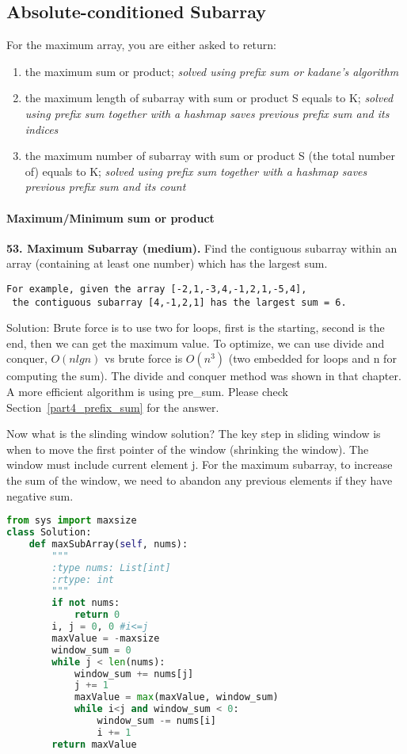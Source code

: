\documentclass[../main.tex]{subfiles}
\begin{document}
\subsection{Absolute-conditioned Subarray}
For the maximum array, you are either asked to return: 
\begin{enumerate}
\item the maximum sum or product; \textit{solved using prefix sum or kadane's algorithm}
\item the maximum length of subarray with sum or product S equals to K; \textit{solved using prefix sum together with a hashmap saves previous prefix sum and its indices}
\item the maximum number of subarray with sum or product S (the total number of) equals to K; \textit{solved using prefix sum together with a hashmap saves previous prefix sum and its count}
\end{enumerate}

\paragraph{Maximum/Minimum sum or product}
\begin{examples}[resume]
\item \textbf{53. Maximum Subarray (medium).}
Find the contiguous subarray within an array (containing at least one number) which has the largest sum.
\begin{lstlisting}[numbers=none]
For example, given the array [-2,1,-3,4,-1,2,1,-5,4],
 the contiguous subarray [4,-1,2,1] has the largest sum = 6.
\end{lstlisting}
Solution: Brute force is to use two for loops, first is the starting, second is the end, then we can get the maximum value. To optimize, we can use divide and conquer, $O(nlgn)$ vs brute force is $O(n^3)$ (two embedded for loops and n for computing the sum). The divide and conquer method was shown in that chapter. A more efficient algorithm is using pre\_sum. Please check Section~\ref{part4_prefix_sum} for the answer. 

Now what is the slinding window solution? The key step in sliding window is when to move the first pointer of the window (shrinking the window). The window must include current element j. For the maximum subarray, to increase the sum of the window, we need to abandon any previous elements if they have negative sum.
\begin{lstlisting}[language = Python]
from sys import maxsize
class Solution:
    def maxSubArray(self, nums):
        """
        :type nums: List[int]
        :rtype: int
        """
        if not nums:
            return 0
        i, j = 0, 0 #i<=j
        maxValue = -maxsize
        window_sum = 0
        while j < len(nums):
            window_sum += nums[j]
            j += 1
            maxValue = max(maxValue, window_sum)
            while i<j and window_sum < 0:
                window_sum -= nums[i]
                i += 1                           
        return maxValue
\end{lstlisting}
\end{examples}
\end{document}
